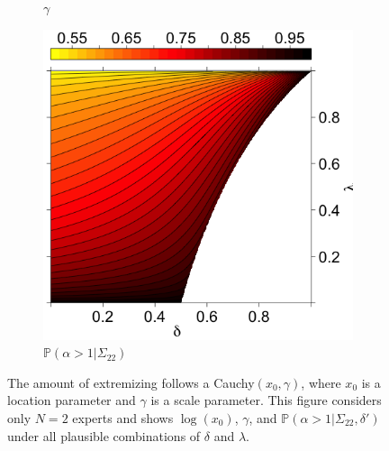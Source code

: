 \documentclass[11pt]{article}
\renewcommand{\P}{\mathbb{P}}
\theoremstyle{definition}
\theoremstyle{definition}
\begin{document}
\begin{figure}[t]
\begin{subfigure}[b]{0.33\textwidth}
\caption{$\gamma$}
\label{gammaOracle}
        \end{subfigure}
\hspace{-1.3em}
        \begin{subfigure}[b]{0.33\textwidth}
                \includegraphics[width=1.07\textwidth, height = \textwidth]{Probs}
\caption{$\P(\alpha > 1 | \Sigma_{22})$}
\label{probOracle}
        \end{subfigure}

        \caption{ The amount of extremizing follows a Cauchy$(x_0, \gamma)$, where $x_0$ is a location parameter and $\gamma$ is a scale parameter. This figure considers only $N = 2$ experts and shows $\log(x_0)$, $\gamma$, and $\P(\alpha > 1 | \Sigma_{22}, \delta')$ under all plausible combinations of $\delta$ and $\lambda$.}
        \label{LevelplotsOracle}
\end{figure}
 
\end{document}
